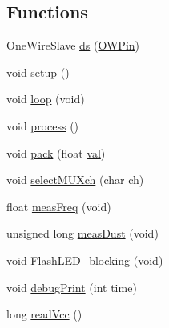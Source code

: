 \subsection*{Functions}
\begin{DoxyCompactItemize}
\item 
One\-Wire\-Slave \hyperlink{OWGeneric__SensorStation_8ino_a29dc68449cb5938be210109740e26ce3}{ds} (\hyperlink{OWRain1_8ino_a7f5aa1ac0711ae18877a165a9bf24625}{O\-W\-Pin})
\item 
void \hyperlink{OWGeneric__SensorStation_8ino_a4fc01d736fe50cf5b977f755b675f11d}{setup} ()
\item 
void \hyperlink{OWGeneric__SensorStation_8ino_a0b33edabd7f1c4e4a0bf32c67269be2f}{loop} (void)
\item 
void \hyperlink{OWGeneric__SensorStation_8ino_a2e9c5136d19b1a95fc427e0852deab5c}{process} ()
\item 
void \hyperlink{OWGeneric__SensorStation_8ino_a097292225769f56d224f441fee48cbdb}{pack} (float \hyperlink{Uno__Read__CurrentTransformer__SCT__013__030_8ino_aa0ccb5ee6d882ee3605ff47745c6467b}{val})
\item 
void \hyperlink{OWGeneric__SensorStation_8ino_ad85ccbb9e4d8bf300045efeaaec603ef}{select\-M\-U\-Xch} (char ch)
\item 
float \hyperlink{OWGeneric__SensorStation_8ino_a56124f4e2476972604bcc35d8c6418b7}{meas\-Freq} (void)
\item 
unsigned long \hyperlink{OWGeneric__SensorStation_8ino_a70fb4c0d491079e66161692c9f3b3437}{meas\-Dust} (void)
\item 
void \hyperlink{OWGeneric__SensorStation_8ino_a4833df7e1a798440cec59dfdf6d1eaf9}{Flash\-L\-E\-D\-\_\-blocking} (void)
\item 
void \hyperlink{OWGeneric__SensorStation_8ino_aea2efd3e27dd82d17fd923d99287f981}{debug\-Print} (int time)
\item 
long \hyperlink{OWGeneric__SensorStation_8ino_a8e23c9421f6663303ea22e4969e2f6c1}{read\-Vcc} ()
\end{DoxyCompactItemize}
